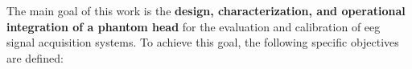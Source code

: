 \documentclass[../../00_Main/Main.tex]{subfiles}
\begin{document}







The main goal of this work is the \textbf{design, characterization, and operational integration of a phantom head} for the evaluation and calibration of \gls{eeg} signal acquisition systems.
To achieve this goal, the following specific objectives are defined:
\end{document}
